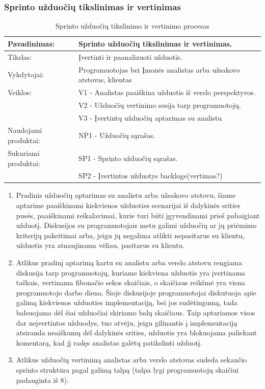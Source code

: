 \documentclass{VUMIFPSkursinis}
\begin{document}
	\subsubsection{Sprinto užduočių tikslinimas ir vertinimas}
	\begin{center}
		\begin{table}[ht]
			\caption{Sprinto užduočių tikslinimo ir vertinimo procesas}
		\begin{tabular}{ | l | l | } 
		\hline
	Pavadinimas:         & Sprinto užduočių tikslinimas ir vertinimas.          		 					 \\ \hline
	Tikslas: 	           & Įvertinti ir paanalizuoti užduotis. 																	\\ \hline
	Vykdytojai:          & Programuotojas bei Įmonės analistas arba užsakovo atstovas, klientas  \\ \hline
	Veiklos:             & V1 - Analistas paaiškina užduotis iš verslo perspektyvos. 		          \\
											 & V2 - Užduočių vertinimo sesija tarp programuotojų.					             \\
											 & V3 - Įvertintų užduočių aptarimas su analistu 									          \\ \hline
	Naudojami produktai: & NP1 - Užduočių sąrašas. 													 							           \\ \hline
	Sukuriami produktai: & SP1 - Sprinto užduočių sąrašas. 																	          \\ 
											 & SP2 - Įvertintos užduotys backloge(vertimas?) 										           \\ \hline
\end{tabular}
\end{table}
\end{center}
\begin{enumerate}
	\item Pradinis užduočių aptarimas su analistu arba užsakovo atstovu, šiame aptarime paaiškinami kiekvienos užduoties scenarijai iš dalykinės srities pusės, paaiškinami reikalavimai, kurie turi būti įgyvendinami prieš pabaigiant užduotį. Diskusijos su programuotojais metu galimi užduočių ar jų priėmimo kriterijų pakeitimai arba, jeigu jų negalima atlikti nepasitarus su klientu, užduotis yra atnaujinama vėliau, pasitarus su klientu.
	\item Atlikus pradinį aptarimą kartu su analistu arba verslo atstovu rengiama diskusija tarp programuotojų, kuriame kiekviena užduotis yra įvertinama taškais, vertinama fibonačio sekos skaičiais, o skaičiaus reikšmė yra viena programuotojo darbo diena. Šioje diskusijoje programuotojai diskutuoja apie galimą kiekvienos užduoties implementaciją, bei jos sudėtingumą, tada balsuojama dėl šiai užduočiai skiriamo balų skaičiaus. Taip aptariamos visos dar neįvertintos užduodys, tuo atvėju, jeigu gilinantis į implementaciją atsiranda neaiškumų dėl dalykinės srities, užduotis yra blokuojama paliekant komentarą, kad jį radęs analistas galėtų patikslinti užduotį.
	\item Atlikus užduočių vertinimą analistas arba verslo atstovas sudeda sekančio sprinto struktūra pagal galimą talpą (talpa lygi programuotojų skaičiui padauginta iš 8). 
\end{enumerate}
\end{document}
